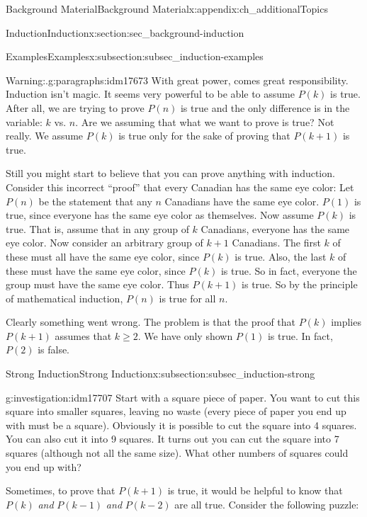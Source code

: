 \documentclass[oneside,10pt,]{book}
\numberwithin{equation}{chapter}
\begin{document}
\begin{appendixptx}{Background Material}{}{Background Material}{}{}{x:appendix:ch_additionalTopics}
\begin{sectionptx}{Induction}{}{Induction}{}{}{x:section:sec_background-induction}
\begin{subsectionptx}{Examples}{}{Examples}{}{}{x:subsection:subsec_induction-examples}
\begin{paragraphs}{Warning:.}{g:paragraphs:idm17673}
With great power, comes great responsibility. Induction isn't magic. It seems very powerful to be able to assume \(P(k)\) is true. After all, we are trying to prove \(P(n)\) is true and the only difference is in the variable: \(k\) vs. \(n\). Are we assuming that what we want to prove is true? Not really. We assume \(P(k)\) is true only for the sake of proving that \(P(k+1)\) is true.%
\par
Still you might start to believe that you can prove anything with induction. Consider this incorrect ``proof'' that every Canadian has the same eye color: Let \(P(n)\) be the statement that any \(n\) Canadians have the same eye color. \(P(1)\) is true, since everyone has the same eye color as themselves. Now assume \(P(k)\) is true. That is, assume that in any group of \(k\) Canadians, everyone has the same eye color. Now consider an arbitrary group of \(k+1\) Canadians. The first \(k\) of these must all have the same eye color, since \(P(k)\) is true. Also, the last \(k\) of these must have the same eye color, since \(P(k)\) is true. So in fact, everyone the group must have the same eye color. Thus \(P(k+1)\) is true. So by the principle of mathematical induction, \(P(n)\) is true for all \(n\).%
\par
Clearly something went wrong. The problem is that the proof that \(P(k)\) implies \(P(k+1)\) assumes that \(k \ge 2\). We have only shown \(P(1)\) is true. In fact, \(P(2)\) is false.%
\end{paragraphs}%
\end{subsectionptx}
%
%
\typeout{************************************************}
\typeout{************************************************}
%
\begin{subsectionptx}{Strong Induction}{}{Strong Induction}{}{}{x:subsection:subsec_induction-strong}
\begin{investigation}{}{g:investigation:idm17707}%
Start with a square piece of paper. You want to cut this square into smaller squares, leaving no waste (every piece of paper you end up with must be a square). Obviously it is possible to cut the square into 4 squares. You can also cut it into 9 squares. It turns out you can cut the square into 7 squares (although not all the same size). What other numbers of squares could you end up with?%
\end{investigation}
Sometimes, to prove that \(P(k+1)\) is true, it would be helpful to know that \(P(k)\) \emph{and} \(P(k-1)\) \emph{and} \(P(k-2)\) are all true. Consider the following puzzle:%

\end{subsectionptx}
\end{sectionptx}
\end{appendixptx}
\end{document}

